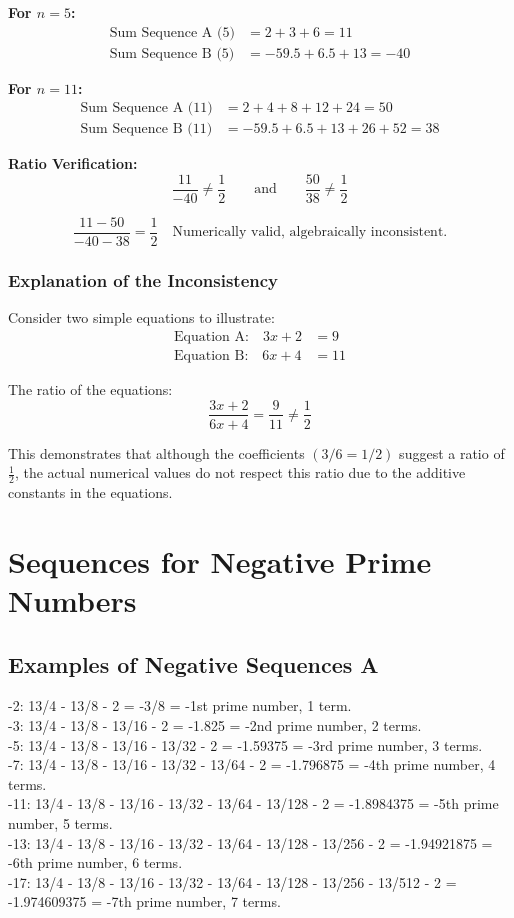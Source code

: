 \documentclass[a4paper,11pt]{article}
\begin{document}
\textbf{For $n = 5$:}
\begin{align}
\text{Sum Sequence A (5)} &= 2 + 3 + 6 = 11 \\
\text{Sum Sequence B (5)} &= -59.5 + 6.5 + 13 = -40
\end{align}

\textbf{For $n = 11$:}
\begin{align}
\text{Sum Sequence A (11)} &= 2 + 4 + 8 + 12 + 24 = 50 \\
\text{Sum Sequence B (11)} &= -59.5 + 6.5 + 13 + 26 + 52 = 38
\end{align}

\textbf{Ratio Verification:}
\[
\frac{11}{-40} \neq \frac{1}{2}
\qquad\text{and}\qquad
\frac{50}{38} \neq \frac{1}{2}
\]

\[
\frac{11 - 50}{-40 - 38} = \frac{1}{2}
\quad\text{Numerically valid, algebraically inconsistent.}
\]

\subsubsection{Explanation of the Inconsistency}

Consider two simple equations to illustrate:
\begin{align}
\text{Equation A:} \quad 3x + 2 &= 9 \\
\text{Equation B:} \quad 6x + 4 &= 11
\end{align}

The ratio of the equations:
\[
\frac{3x + 2}{6x + 4} = \frac{9}{11} \neq \frac{1}{2}
\]

This demonstrates that although the coefficients $(3/6 = 1/2)$ suggest a ratio of $\frac{1}{2}$, the actual numerical values do not respect this ratio due to the additive constants in the equations.

\section*{Sequences for Negative Prime Numbers}

\subsection*{Examples of Negative Sequences A}

-2: 13/4 - 13/8 - 2 = -3/8 = -1st prime number, 1 term.\\
-3: 13/4 - 13/8 - 13/16 - 2 = -1.825 = -2nd prime number, 2 terms.\\
-5: 13/4 - 13/8 - 13/16 - 13/32 - 2 = -1.59375 = -3rd prime number, 3 terms.\\
-7: 13/4 - 13/8 - 13/16 - 13/32 - 13/64 - 2 = -1.796875 = -4th prime number, 4 terms.\\
-11: 13/4 - 13/8 - 13/16 - 13/32 - 13/64 - 13/128 - 2 = -1.8984375 = -5th prime number, 5 terms.\\
-13: 13/4 - 13/8 - 13/16 - 13/32 - 13/64 - 13/128 - 13/256 - 2 = -1.94921875 = -6th prime number, 6 terms.\\
-17: 13/4 - 13/8 - 13/16 - 13/32 - 13/64 - 13/128 - 13/256 - 13/512 - 2 = -1.974609375 = -7th prime number, 7 terms.\\
\end{document}
